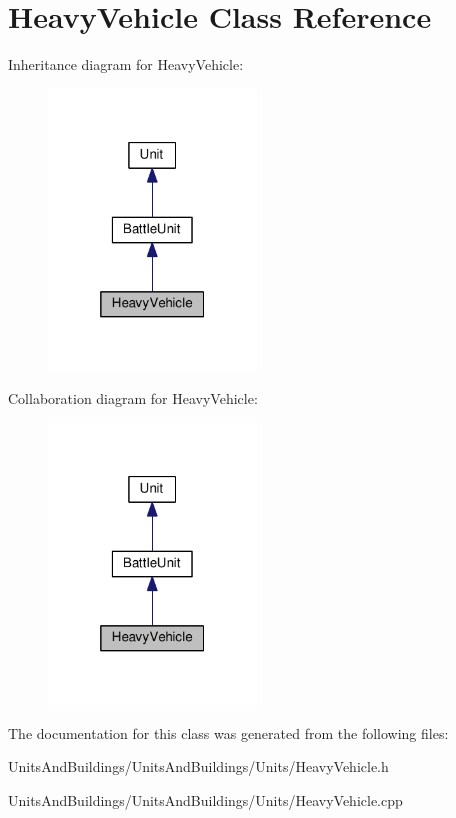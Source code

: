 \hypertarget{class_heavy_vehicle}{}\section{Heavy\+Vehicle Class Reference}
\label{class_heavy_vehicle}


Inheritance diagram for Heavy\+Vehicle\+:
\nopagebreak
\begin{figure}[H]
\begin{center}
\leavevmode
\includegraphics[width=157pt]{class_heavy_vehicle__inherit__graph}
\end{center}
\end{figure}


Collaboration diagram for Heavy\+Vehicle\+:
\nopagebreak
\begin{figure}[H]
\begin{center}
\leavevmode
\includegraphics[width=157pt]{class_heavy_vehicle__coll__graph}
\end{center}
\end{figure}


The documentation for this class was generated from the following files\+:\begin{DoxyCompactItemize}
\item 
Units\+And\+Buildings/\+Units\+And\+Buildings/\+Units/Heavy\+Vehicle.\+h\item 
Units\+And\+Buildings/\+Units\+And\+Buildings/\+Units/Heavy\+Vehicle.\+cpp\end{DoxyCompactItemize}
